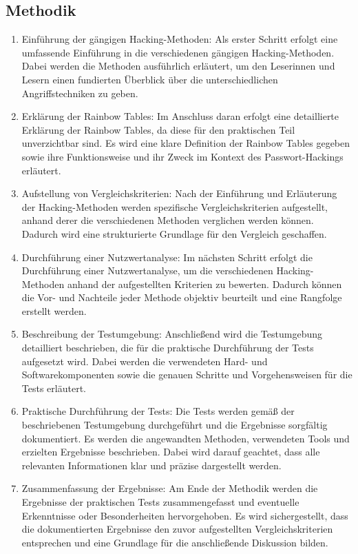 \subsection{Methodik}
\begin{enumerate}
  \item Einführung der gängigen Hacking-Methoden: Als erster Schritt erfolgt eine umfassende Einführung in die verschiedenen gängigen Hacking-Methoden. Dabei werden die Methoden ausführlich erläutert, um den Leserinnen und Lesern einen fundierten Überblick über die unterschiedlichen Angriffstechniken zu geben.
  \item Erklärung der Rainbow Tables: Im Anschluss daran erfolgt eine detaillierte Erklärung der Rainbow Tables, da diese für den praktischen Teil unverzichtbar sind. Es wird eine klare Definition der Rainbow Tables gegeben sowie ihre Funktionsweise und ihr Zweck im Kontext des Passwort-Hackings erläutert.
  \item Aufstellung von Vergleichskriterien: Nach der Einführung und Erläuterung der Hacking-Methoden werden spezifische Vergleichskriterien aufgestellt, anhand derer die verschiedenen Methoden verglichen werden können. Dadurch wird eine strukturierte Grundlage für den Vergleich geschaffen.
  \item Durchführung einer Nutzwertanalyse: Im nächsten Schritt erfolgt die Durchführung einer Nutzwertanalyse, um die verschiedenen Hacking-Methoden anhand der aufgestellten Kriterien zu bewerten. Dadurch können die Vor- und Nachteile jeder Methode objektiv beurteilt und eine Rangfolge erstellt werden.
  \item Beschreibung der Testumgebung: Anschließend wird die Testumgebung detailliert beschrieben, die für die praktische Durchführung der Tests aufgesetzt wird. Dabei werden die verwendeten Hard- und Softwarekomponenten sowie die genauen Schritte und Vorgehensweisen für die Tests erläutert.
  \item Praktische Durchführung der Tests: Die Tests werden gemäß der beschriebenen Testumgebung durchgeführt und die Ergebnisse sorgfältig dokumentiert. Es werden die angewandten Methoden, verwendeten Tools und erzielten Ergebnisse beschrieben. Dabei wird darauf geachtet, dass alle relevanten Informationen klar und präzise dargestellt werden.
  \item Zusammenfassung der Ergebnisse: Am Ende der Methodik werden die Ergebnisse der praktischen Tests zusammengefasst und eventuelle Erkenntnisse oder Besonderheiten hervorgehoben. Es wird sichergestellt, dass die dokumentierten Ergebnisse den zuvor aufgestellten Vergleichskriterien entsprechen und eine Grundlage für die anschließende Diskussion bilden.
\end{enumerate}
